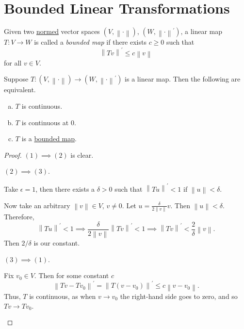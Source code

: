 \section{Bounded Linear Transformations}
\begin{definition}\label{def:bounded-linear-transformation}
	Given two \hyperref[def:norm]{normed} vector spaces \((V,\left\lVert \cdot\right\rVert )\), \((W,\left\lVert \cdot\right\rVert^\prime )\),
	a linear map \(T \colon V \to W\) is called a \emph{bounded map} if there exists \(c \geq 0\) such that
	\[
		\left\lVert Tv\right\rVert^\prime \leq c\left\lVert v\right\rVert
	\]
	for all \(v \in V\).
\end{definition}

\begin{proposition}
	Suppose \(T \colon (V, \left\lVert \cdot\right\rVert) \to (W, \left\lVert \cdot\right\rVert^\prime )\) is a linear map. Then the following are equivalent.
	\begin{enumerate}[(a)]
		\item \(T\) is continuous.
		\item \(T\) is continuous at \(0\).
		\item \(T\) is a \hyperref[def:bounded-linear-transformation]{bounded map}.
	\end{enumerate}
\end{proposition}
\begin{proof}
	\((1)\implies(2)\) is clear.
	\begin{claim}
		\((2)\implies(3)\).
	\end{claim}
	\begin{explanation}
		Take \(\epsilon = 1\), then there exists a \(\delta > 0\) such that \(\left\lVert Tu\right\rVert^\prime < 1\)
		if \(\left\lVert u\right\rVert < \delta\).

		Now take an arbitrary \(\left\lVert v \right\rVert\in V\), \(v \neq 0\). Let \(u = \frac{\delta}{2\left\lVert v\right\rVert}v\). Then \(\left\lVert u\right\rVert < \delta\).
		Therefore,
		\[
			\left\lVert Tu\right\rVert ^\prime <1 \implies \frac{\delta }{2\left\lVert v\right\rVert }\left\lVert Tv\right\rVert ^\prime < 1\implies \left\lVert Tv\right\rVert ^\prime < \frac{2}{\delta }\left\lVert v\right\rVert .
		\]
		Then \(2/\delta\) is our constant.
	\end{explanation}
	\begin{claim}
		\((3)\implies (1)\).
	\end{claim}
	\begin{explanation}
		Fix \(v_0 \in V\). Then for some constant \(c\)
		\[
			\left\lVert Tv - Tv_0\right\rVert^\prime = \left\lVert T(v - v_0)\right\rVert ^\prime \leq c\left\lVert v - v_0\right\rVert.
		\]
		Thus, \(T\) is continuous, as when \(v \to v_0\) the right-hand side goes to zero, and so \(Tv \to Tv_0\).
	\end{explanation}
\end{proof}

